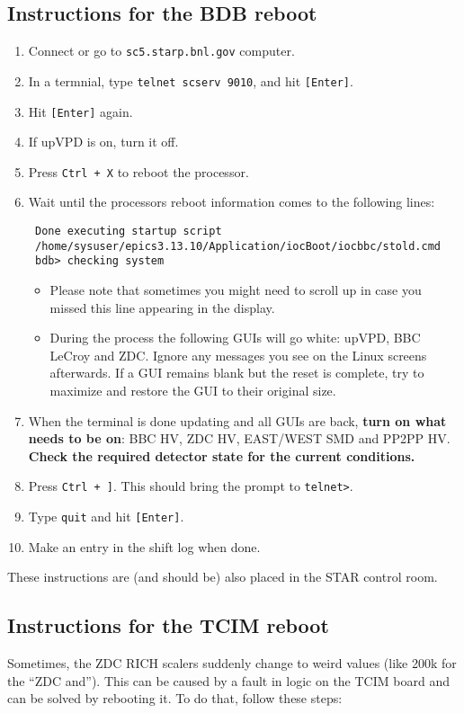 \subsection{Instructions for the BDB reboot}
\label{bdbreboot}

\begin{enumerate}
\item Connect or go to \texttt{sc5.starp.bnl.gov} computer.
\item In a termnial, type \texttt{telnet scserv 9010}, and hit \texttt{[Enter]}.
\item Hit  \texttt{[Enter]} again.
\item If upVPD is on, turn it off.
\item Press \texttt{Ctrl + X} to reboot the processor.
\item Wait until the processors reboot information comes to the following lines:
\noindent
\begin{verbatim}
 Done executing startup script
 /home/sysuser/epics3.13.10/Application/iocBoot/iocbbc/stold.cmd
 bdb> checking system
\end{verbatim}

\begin{itemize}
 \item Please note that sometimes you might need to scroll up in case you missed this line appearing in the display.
 \item During the process the following GUIs will go white: upVPD, BBC LeCroy and ZDC. Ignore any messages you see on the Linux screens afterwards. If a GUI remains blank but the reset is complete, try to maximize and restore the GUI to their original size.
\end{itemize}

\item When the terminal is done updating and all GUIs are back, \textbf{turn on what needs to be on}: BBC HV, ZDC HV, EAST/WEST SMD and PP2PP HV. \textbf{Check the required detector state for the current conditions.}
\item Press \texttt{Ctrl + ]}. This should bring the prompt to \texttt{telnet>}.
\item Type \texttt{quit} and hit \texttt{[Enter]}.
\item Make an entry in the shift log when done.
\end{enumerate}

These instructions are (and should be) also placed in the STAR control room.

\subsection{Instructions for the TCIM reboot}
Sometimes, the ZDC RICH scalers suddenly change to weird values (like 200k for the ``ZDC and''). This can be caused by a fault in logic on the TCIM board and can be solved by rebooting it.
To do that, follow these steps:


